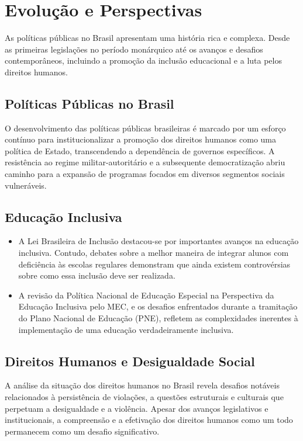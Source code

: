\documentclass[
   article,       
   12pt,          
   oneside,       
   a4paper,       
   english,       
   brazil,        
   sumario=tradicional
   ]{abntex2}
\begin{document}
\section{Evolução e Perspectivas}
As políticas públicas no Brasil apresentam uma história rica e complexa. Desde as primeiras legislações no período monárquico até os avanços e desafios contemporâneos, incluindo a promoção da inclusão educacional e a luta pelos direitos humanos. 

\subsection{Políticas Públicas no Brasil}
O desenvolvimento das políticas públicas brasileiras é marcado por um esforço contínuo para institucionalizar a promoção dos direitos humanos como uma política de Estado, transcendendo a dependência de governos específicos. A resistência ao regime militar-autoritário e a subsequente democratização abriu caminho para a expansão de programas focados em diversos segmentos sociais vulneráveis.

\subsection{Educação Inclusiva}
\begin{itemize}
    \item A Lei Brasileira de Inclusão destacou-se por importantes avanços na educação inclusiva. Contudo, debates sobre a melhor maneira de integrar alunos com deficiência às escolas regulares demonstram que ainda existem controvérsias sobre como essa inclusão deve ser realizada. 
    \item A revisão da Política Nacional de Educação Especial na Perspectiva da Educação Inclusiva pelo MEC, e os desafios enfrentados durante a tramitação do Plano Nacional de Educação (PNE), refletem as complexidades inerentes à implementação de uma educação verdadeiramente inclusiva.
\end{itemize}

\subsection{Direitos Humanos e Desigualdade Social}
A análise da situação dos direitos humanos no Brasil revela desafios notáveis relacionados à persistência de violações, a questões estruturais e culturais que perpetuam a desigualdade e a violência. Apesar dos avanços legislativos e institucionais, a compreensão e a efetivação dos direitos humanos como um todo permanecem como um desafio significativo.
\end{document}
